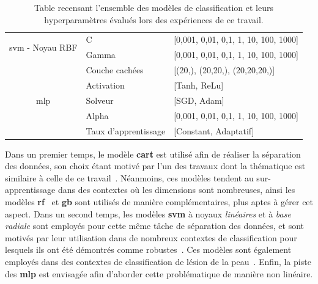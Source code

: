 \begin{table}[H]
\begin{tabular}{cll}
        \multirow{2}{*}{\gls{svm} - Noyau RBF}          & C                         & [0,001, 0,01, 0,1, 1, 10, 100, 1000]      \\ \cmidrule{2-3}   
                                                        & Gamma                     & [0,001, 0,01, 0,1, 1, 10, 100, 1000]      \\ \midrule 
        \multirow{5}{*}{\gls{mlp}}                      & Couche cachées            & [(20,), (20,20,), (20,20,20,)]            \\ \cmidrule{2-3}
                                                        & Activation                & [Tanh, ReLu]                              \\ \cmidrule{2-3}
                                                        & Solveur                   & [SGD, Adam]                               \\ \cmidrule{2-3}
                                                        & Alpha                     & [0,001, 0,01, 0,1, 1, 10, 100, 1000]      \\ \cmidrule{2-3}
                                                        & Taux d'apprentissage      & [Constant, Adaptatif]                     \\ \bottomrule 
    \end{tabular} 
    \caption{Table recensant l'ensemble des modèles de classification et leurs hyperparamètres évalués lors des expériences de ce travail.}
    \label{tab:image_classification_models_hyperparameters}
\end{table}\par

Dans un premier temps, le modèle \textbf{\gls{cart}} est utilisé afin de réaliser la séparation des données, son choix étant motivé par l'un des travaux dont la thématique est similaire à celle de ce travail~\cite{Wiltgen2008}. Néanmoins, ces modèles tendent au sur-apprentissage dans des contextes où les dimensions sont nombreuses, ainsi les modèles \textbf{\gls{rf}}~\cite{Breiman2001} et \textbf{\gls{gb}} sont utilisés de manière complémentaires, plus aptes à gérer cet aspect. Dans un second temps, les modèles \textbf{\gls{svm}} à noyaux \textit{linéaires} et à \textit{base radiale} sont employés pour cette même tâche de séparation des données, et sont motivés par leur utilisation dans de nombreux contextes de classification pour lesquels ils ont été démontrés comme robustes~\cite{Smach2008a}. Ces modèles sont également employés dans des contextes de classification de lésion de la peau~\cite{Celebi2007}. Enfin, la piste des \textbf{\gls{mlp}} est envisagée afin d'aborder cette problématique de manière non linéaire.\par


